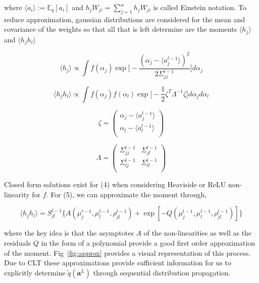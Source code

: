 where $\langle a_i\rangle := \mathbb{E}_{q}[a_i]$ and $h_jW_{ji} = \sum_{j=1}^nh_jW_{ji}$ is called Einstein notation. To reduce approximation, gaussian distributions are considered for the mean and covariance of the weights so that all that is left determine are the moments $\langle h_j\rangle$ and $\langle h_jh_l\rangle$

\begin{equation}
\langle h_j\rangle \propto \int f(\alpha_j)\exp\bigg[-\frac{(\alpha_j-\langle a_j^{l-1}\rangle)^2}{2\Sigma_{jj}^{l-1}}\bigg]d\alpha_j
\end{equation}

\begin{equation}
\langle h_jh_l\rangle \propto \int f(\alpha_j)f(\alpha_l)\exp\bigg[-\frac{1}{2}\zeta^T\Lambda^{-1}\zeta\bigg]d\alpha_jd\alpha_l
\end{equation}

$$
\zeta = \begin{pmatrix} \alpha_j - \langle a_j^{l-1}\rangle\\ \alpha_l - \langle a_l^{l-1}\rangle\\\end{pmatrix}
$$

$$
\Lambda = \begin{pmatrix} \Sigma_{jj}^{l-1} & \Sigma_{jl}^{l-1}\\ \Sigma_{lj}^{l-1} & \Sigma_{ll}^{l-1}\\\end{pmatrix}
$$

 Closed form solutions exist for (4) when considering Heaviside or ReLU non-linearity for $f$. For (5), we can approximate the moment through,

\begin{equation}
\langle h_jh_l\rangle = S_{jl}^{l-1}\bigg\{A(\mu_j^{l-1},\mu_{l}^{l-1},\rho_{jl}^{l-1})+\exp[-Q(\mu_j^{l-1},\mu_l^{l-1},\rho_{jl}^{l-1})]\bigg\}
\end{equation}

where the key idea is that the asymptotes $A$ of the non-linearities as well as the residuals $Q$ in the form of a polynomial provide a good first order approximation of the moment. Fig~\ref{fig:approx} provides a visual representation of this process. Due to CLT these approximations provide sufficient information for us to explicitly determine $\tilde{q}(\bm{a}^L)$ through sequential distribution propagation.

